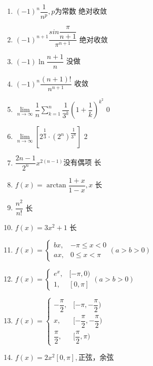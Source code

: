\documentclass[UTF8,a4paper,12pt,scheme=chinese]{ctexart}
\begin{document}
\begin{enumerate}
	\item 	$ (-1)^n\dfrac{1}{n^p},p $为常数	绝对收敛
	\item 	$ (-1)^{n+1}\dfrac{sin\dfrac{\pi}{n+1}}{\pi^{n+1}} $	绝对收敛
	\item 	$ (-1)\ln\dfrac{n+1}{n} $	没做
	\item 	$ (-1)^n\dfrac{(n+1)!}{n^{n+1}} $	收敛
	\item 	$ \lim\limits_{n\rightarrow \infty}\dfrac{1}{n}\sum_{k=1}^{n}\dfrac{1}{3^k}(1+\dfrac{1}{k})^{k^2} $	0
	\item 	$ \lim\limits_{n\rightarrow \infty}[2^{\dfrac{1}{3}}\cdot{(2^n)}^{\dfrac{1}{3^n}}] $	2
	\item 	$ \dfrac{2n-1}{2^n}x^{2(n-1)} $没有偶项	长
	\item 	$ f(x)=\arctan\dfrac{1+x}{1-x},x $	长
	\item 	$ \dfrac{n^2}{n!} $	长
	\item 	$ f(x)=3x^2+1 $	长
	\item 	$ f(x)=\left\lbrace \begin{array}{ll}bx,&-\pi\leq x{<}0\\ax,&0\leq x{<}\pi\end{array} \right.(a{>}b{>}0) $
	\item 	$ f(x)=\left\lbrace \begin{array}{ll}e^x,&[-\pi,0)\\1,&[0,\pi]\end{array} \right.(a{>}b{>}0) $
	\item 	$ f(x)=\left\lbrace \begin{array}{ll}-\dfrac{\pi}{2},&[-\pi,-\dfrac{\pi}{2})\\x,&[-\dfrac{\pi}{2},-\dfrac{\pi}{2})\\\dfrac{\pi}{2},&[\dfrac{\pi}{2},\pi)\end{array} \right. $
	\item 	$ f(x)=2x^2[0,\pi], $正弦，余弦
	
	
\end{enumerate}
\end{document}
